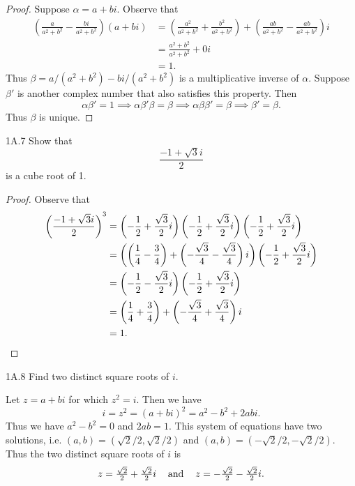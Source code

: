 \documentclass{exam}
\newcommand{\paren}[1]{\left(#1\right)}
\begin{document}
\begin{proof}
    Suppose $\alpha = a + bi$. Observe that
    \begin{align*}
        \paren{\frac{a}{a^2+b^2}-\frac{bi}{a^2+b^2}}(a+bi) &= \paren{\frac{a^2}{a^2+b^2}+\frac{b^2}{a^2+b^2}} + \paren{\frac{ab}{a^2+b^2} - \frac{ab}{a^2 + b^2}}i\\
        &=\frac{a^2+b^2}{a^2+b^2} + 0i\\
        &= 1.
    \end{align*}
    Thus $\beta = a/(a^2+b^2) - bi/(a^2+b^2)$ is a multiplicative inverse of $\alpha$. Suppose $\beta'$ is another complex number that also satisfies this property. Then \[
        \alpha\beta' = 1 \implies \alpha\beta'\beta=\beta \implies \alpha\beta\beta' = \beta \implies \beta'=\beta.
    \]
    Thus $\beta$ is unique.
\end{proof}

\begin{problem}{1A.7}
    Show that $$\frac{-1+\sqrt3i}2$$ is a cube root of 1.
\end{problem}

\begin{proof}
    Observe that
    \begin{align*}
        \paren{\frac{-1+\sqrt3i}2}^3&=\paren{-\frac12 + \frac{\sqrt3}2i}\paren{-\frac12 + \frac{\sqrt3}2i}\paren{-\frac12 + \frac{\sqrt3}2i}\\
        &=\paren{\paren{\frac14-\frac34}+\paren{-\frac{\sqrt3}4-\frac{\sqrt3}4}i}\paren{-\frac12+\frac{\sqrt3}2i}\\
        &=\paren{-\frac12-\frac{\sqrt3}2i}\paren{-\frac12+\frac{\sqrt3}2i}\\
        &=\paren{\frac14+\frac34} + \paren{-\frac{\sqrt3}4 + \frac{\sqrt3}4}i\\
        &=1. \qedhere
    \end{align*}
\end{proof}

\begin{problem}{1A.8}
    Find two distinct square roots of $i$.
\end{problem}

Let $z = a+bi$ for which $z^2 = i$. Then we have \[
    i = z^2 = (a+bi)^2 = a^2-b^2 + 2abi.
\]
Thus we have $a^2-b^2 = 0$ and $2ab = 1$. This system of equations have two solutions, i.e. $(a, b) = (\sqrt2/2, \sqrt2/2)$ and $(a, b) = (-\sqrt2/2,-\sqrt2/2)$. Thus the two distinct square roots of $i$ is
\begin{align*}
    \begin{tabular}{ccc}
        $z=\frac{\sqrt2}2 + \frac{\sqrt2}2i$ &and& $z=-\frac{\sqrt2}2 - \frac{\sqrt2}2i$.
    \end{tabular}
\end{align*}
\end{document}
